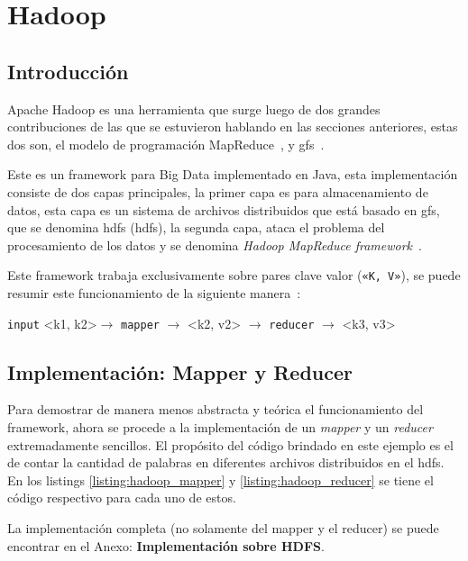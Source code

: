 \section{Hadoop}
\label{sec:hadoop}

\subsection*{Introducción}
Apache Hadoop es una herramienta que surge luego de dos grandes contribuciones
de las que se estuvieron hablando en las secciones anteriores, estas dos son,
el modelo de programación MapReduce~\cite{dean2004, dean2008}, y
\acrshort{gfs}~\cite{ghemawat2003}.

Este es un \gls{framework} para Big Data implementado en Java, esta
implementación consiste de dos capas principales, la primer capa es para
almacenamiento de datos, esta capa es
 un sistema de archivos distribuidos que está basado en \acrshort{gfs}, 
que se denomina \acrlong{hdfs} (\acrshort{hdfs}), la segunda capa, ataca el
problema del procesamiento de los datos y se denomina {\it Hadoop MapReduce
\Gls{framework}}~\cite{lee2012}.

Este \gls{framework} trabaja exclusivamente sobre pares clave valor ({\tt «K,
V»}), se puede resumir este funcionamiento de la siguiente manera~\cite{}:

\begin{tcolorbox}
  \centering
  {\tt input} <k1, k2>$\rightarrow$ {\tt mapper} $\rightarrow$ <k2, v2> $\rightarrow$
  {\tt reducer} $\rightarrow$ <k3, v3>
\end{tcolorbox}

\subsection*{Implementación: Mapper y Reducer}

Para demostrar de manera menos abstracta y teórica el funcionamiento del
framework, ahora se procede a la implementación de un {\it mapper} y un {\it
reducer} extremadamente sencillos. El propósito del código brindado en este 
ejemplo es el de contar
la cantidad de palabras en diferentes archivos distribuidos en el
\acrshort{hdfs}. En los listings \ref{listing:hadoop_mapper} y
\ref{listing:hadoop_reducer} se tiene el código respectivo para cada uno de estos. 

La implementación completa (no solamente del mapper y el reducer) se puede encontrar
en el Anexo: {\bf Implementación sobre HDFS}.







